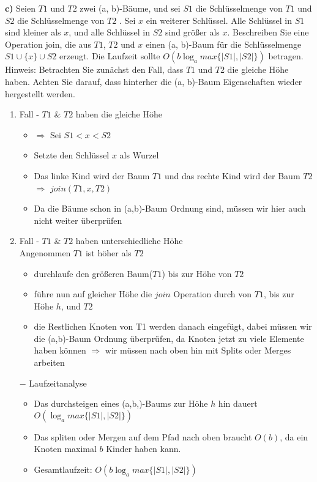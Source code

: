 	

\newpage
\noindent
\textbf{c)} Seien $T1$ und $T2$ zwei (a, b)-Bäume, und sei $S1$ die Schlüsselmenge von $T1$ und $S2$ die Schlüsselmenge von $T2$ . Sei $x$ ein weiterer Schlüssel. Alle Schlüssel in $S1$ sind kleiner als $x$, und alle Schlüssel in $S2$ sind größer als $x$. Beschreiben Sie eine Operation join, die aus $T1$, $T2$ und $x$ einen (a, b)-Baum für die Schlüsselmenge $S1 \cup \{x\} \cup S2$ erzeugt. Die Laufzeit sollte $O(b \log_{a} max\{|S1|, |S2|\})$ betragen. Hinweis: Betrachten Sie zunächst den Fall, dass $T1$ und $T2$ die gleiche Höhe haben. Achten Sie darauf, dass hinterher die (a, b)-Baum Eigenschaften wieder hergestellt werden.\\

\begin{enumerate}
\item Fall - $T1$ \& $T2$ haben die gleiche Höhe
	\begin{itemize}
	\item $\Rightarrow$ Sei $S1 < x < S2$
	\item Setzte den Schlüssel $x$ als Wurzel
	\item Das linke Kind wird der Baum $T1$ und das rechte Kind wird der Baum $T2$ $\Rightarrow$ $join(T1, x, T2)$
	\item Da die Bäume schon in (a,b)-Baum Ordnung sind, müssen wir hier auch nicht weiter überprüfen 
	\end{itemize}


\item Fall - $T1$ \& $T2$ haben unterschiedliche Höhe\\
Angenommen $T1$ ist höher als $T2$
\begin{itemize}
	\item durchlaufe den größeren Baum($T1$) bis zur Höhe von $T2$
	\item führe nun auf gleicher Höhe die $join$ Operation durch von $T1$, bis zur Höhe $h$, und $T2$ 
	\item die Restlichen Knoten von T1 werden danach eingefügt, dabei müssen wir die (a,b)-Baum Ordnung überprüfen, da Knoten jetzt zu viele Elemente haben können $\Rightarrow$ wir müssen nach oben hin mit Splits oder Merges arbeiten
\end{itemize}

\item[$-$] Laufzeitanalyse
\begin{itemize}
	\item Das durchsteigen eines (a,b,)-Baums zur Höhe $h$ hin dauert $O(\log_{a} max\{|S1|, |S2|\})$
	\item Das spliten oder Mergen auf dem Pfad nach oben braucht $O(b)$, da ein Knoten maximal $b$ Kinder haben kann.
	\item Gesamtlaufzeit: $O(b \log_{a} max\{|S1|, |S2|\})$
\end{itemize}

\end{enumerate}